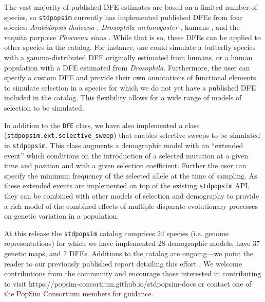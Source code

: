 \documentclass[hidelinks]{article}
\newcommand{\stdpopsim}{\texttt{stdpopsim}\xspace}
\begin{document}
    The vast majority of published DFE estimates are based on a limited number of species,
    so \stdpopsim currently has implemented published DFEs from
    four species: \textit{Arabidopsis thaleana} \citep{huber2018gene}, \textit{Drosophila melanogaster} \citep{ragsdale2016triallelic,huber2017determining},
    humans \citep{huber2017determining,kim2017inference}, and the vaquita porpoise \textit{Phocoena sinus} \citep{robinson2022critically}.
    While that is so, these DFEs can be applied to other species
    in the catalog. For instance, one could simulate a butterfly species with a gamma-distributed DFE originally
    estimated from humans, or a human population with a DFE estimated from \textit{Drosophila}.
    Furthermore, the user can specify a custom DFE and provide their own annotations
    of functional elements to simulate selection in a species for which we do not yet have 
    a published DFE included in the catalog. This flexibility allows for a wide range of
    models of selection to be simulated. %
   
    In addition to the \texttt{DFE} class, we have also implemented a class (\texttt{stdpopsim.ext.selective\_sweep})
    that enables selective sweeps to be simulated in \stdpopsim.
    This class augments a demographic model with an ``extended event''
    which conditions on the introduction of a selected mutation at a given time and position
    and with a given selection coefficient. Further the user can specify the minimum frequency
    of the selected allele at the time of sampling. As these extended events are implemented
    on top of the existing \stdpopsim API, they can be combined with other models of selection
    and demography to provide a rich model of the combined effects of multiple disparate evolutionary processes
    on genetic variation in a population.
    

    At this release the \stdpopsim catalog comprises 24 species (i.e. genome representations)
    for which we have implemented 28 demographic models, have 37 genetic maps, and 7 DFEs. %
    Additions to the catalog are ongoing---we point the reader to our previously published 
    report detailing this effort \citep{lauterbur2023expanding}. We welcome contributions from the
    community and encourage those interested in contributing to visit https://popsim-consortium.github.io/stdpopsim-docs
    or contact one of the PopSim Consortium members for guidance.
\end{document}
